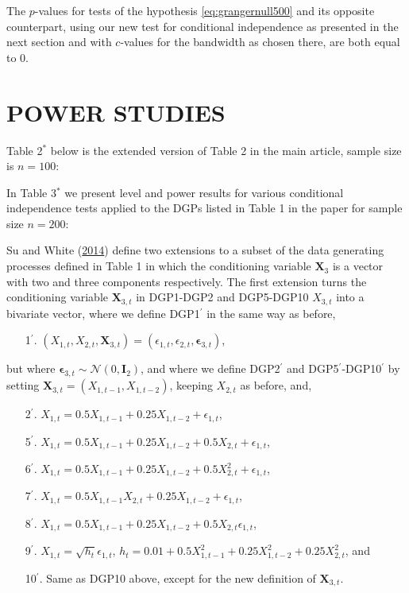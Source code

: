 \documentclass[
  12pt,
  letterpaper]{article}
\providecommand{\tightlist}{%
  \setlength{\itemsep}{0pt}\setlength{\parskip}{0pt}}
\numberwithin{equation}{section}
\newcommand{\X}{\bm{X}}
\newcommand{\fepsilon}{\bm{\epsilon}}
\begin{document}
The \(p\)-values for tests of the hypothesis \eqref{eq:grangernull500} and its opposite counterpart, using our new test for conditional independence as presented in the next section and with \(c\)-values for the bandwidth as chosen there, are both equal to 0.

\hypertarget{power-studies}{%
\section{POWER STUDIES}\label{power-studies}}

Table 2\(^*\) below is the extended version of Table 2 in the main article, sample size is \(n=100\):

\vspace{1cm}



\newpage

In Table 3\(^*\) we present level and power results for various conditional independence tests applied to the DGPs listed in Table 1 in the paper for sample size \(n = 200\):



Su and White (\protect\hyperlink{ref-su2014testing}{2014}) define two extensions to a subset of the data generating processes defined in Table 1 in which the conditioning variable \(\X_3\) is a vector with two and three components respectively. The first extension turns the conditioning variable \(\X_{3,t}\) in DGP1-DGP2 and DGP5-DGP10 \(X_{3,t}\) into a bivariate vector, where we define DGP1\(^{\prime}\) in the same way as before,

\begin{itemize}
\item[1$^{\prime}$.] $(X_{1,t}, X_{2,t}, \X_{3,t}) = (\epsilon_{1,t}, \epsilon_{2,t}, \fepsilon_{3,t})$,
\end{itemize}

but where \(\fepsilon_{3,t} \sim \mathcal{N}(0, \bm{I}_2)\), and where we define DGP2\(^{\prime}\) and DGP5\(^{\prime}\)-DGP10\(^{\prime}\) by setting \(\X_{3,t} = (X_{1, t-1}, X_{1, t-2})\), keeping \(X_{2,t}\) as before, and,

\begin{itemize}
\tightlist
\item[2$^{\prime}$.] $X_{1,t} = 0.5X_{1,t-1} + 0.25X_{1, t-2} + \epsilon_{1,t}$,
\item[5$^{\prime}$.] $X_{1,t} = 0.5X_{1,t-1} + 0.25X_{1, t-2} + 0.5X_{2,t} + \epsilon_{1,t}$,
\item[6$^{\prime}$.] $X_{1,t} = 0.5X_{1,t-1} + 0.25X_{1, t-2} + 0.5X_{2,t}^2 + \epsilon_{1,t}$,
\item[7$^{\prime}$.] $X_{1,t} = 0.5X_{1,t-1}X_{2, t} + 0.25X_{1,t-2}+ \epsilon_{1,t}$,
\item[8$^{\prime}$.] $X_{1,t} = 0.5X_{1,t-1} + 0.25X_{1,t-2} + 0.5X_{2, t}\epsilon_{1,t}$,
\item[9$^{\prime}$.] $X_{1,t} = \sqrt{h_t}\epsilon_{1,t}$, $h_t = 0.01 + 0.5X_{1,t-1}^2 + 0.25X_{1,t-2}^2 + 0.25X_{2,t}^2$, and
\item[10$^{\prime}$.] Same as DGP10 above, except for the new definition of $\X_{3,t}$.
\end{itemize}
\end{document}
